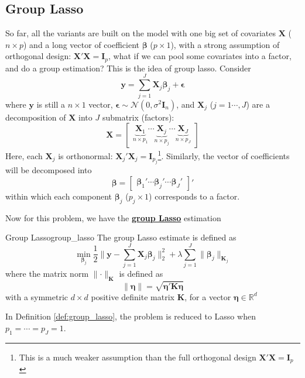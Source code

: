 \documentclass[twoside]{article}
\begin{document}
\subsection{Group Lasso}
So far, all the variants are built on the model with one big set of covariates $\mathbf{X}$ ($n\times p$) and a long vector of coefficient $\boldsymbol{\beta}$ ($p\times 1$), with a strong assumption of orthogonal design: $\mathbf{X}'\mathbf{X}=\mathbf{I}_p$, what if we can pool some covariates into a factor, and do a group estimation? This is the idea of group lasso. Consider 
$$
\mathbf{y} = \sum^J_{j=1}\mathbf{X}_j\boldsymbol{\beta}_j + \boldsymbol{\epsilon}
$$
where $\mathbf{y}$ is still a $n\times 1$ vector, $\boldsymbol{\epsilon}\sim \mathcal{N}(0,\sigma^2\mathbf{I}_n)$, and $\mathbf{X}_j$ ($j=1\cdots,J$) are a decomposition of $\mathbf{X}$ into $J$ submatrix (factors): 
$$
\mathbf{X} = \begin{bmatrix}
    \underbrace{\mathbf{X}_1}_{n\times p_1} \cdots  \underbrace{\mathbf{X}_j}_{n\times p_j} \cdots \underbrace{\mathbf{X}_J}_{n\times p_J}
\end{bmatrix}
$$
Here, each $\mathbf{X}_j$ is orthonormal: $\mathbf{X}_j'\mathbf{X}_j=\mathbf{I}_{p_j}$\footnote{This is a much weaker assumption than the full orthogonal design $\mathbf{X}'\mathbf{X}=\mathbf{I}_p$}. Similarly, the vector of coefficients will be decomposed into $$\boldsymbol{\beta} = \begin{bmatrix}
    \boldsymbol{\beta}_1' \cdots \boldsymbol{\beta}_j' \cdots \boldsymbol{\beta}_J'
\end{bmatrix}'$$
 within which each component $\boldsymbol{\beta}_j$ ($p_j\times 1$) corresponds to a factor.

 Now for this problem, we have the \textbf{\underline{group Lasso}} estimation
 \begin{definition}{Group Lasso}{group_lasso}
    The group Lasso estimate is defined as
    $$
    \min_{\boldsymbol{\beta}_j} \frac{1}{2}\lVert \mathbf{y} - \sum^J_{j=1} \mathbf{X}_j\boldsymbol{\beta}_j \rVert ^2_2 + \lambda \sum^J_{j=1}\lVert \boldsymbol{\beta}_j \rVert _{\mathbf{K}_j}$$
    where the matrix norm $\lVert \cdot \rVert _{\mathbf{K}}$ is defined as 
    $$
    \lVert \boldsymbol{\eta} \rVert = \sqrt{ \boldsymbol{\eta}'\mathbf{K}\boldsymbol{\eta} }
    $$
    with a symmetric $d\times d$ positive definite matrix $\mathbf{K}$, for a vector $\boldsymbol{\eta}\in \mathbb{R}^d$
 \end{definition}
In Definition \ref{def:group_lasso}, the problem is reduced to Lasso when $p_1=\cdots=p_J=1$. 
\end{document}
